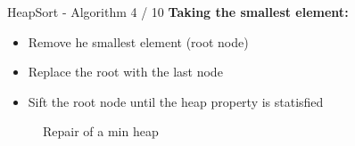 
\begin{frame}{HeapSort - Algorithm 4 / 10}
  \textbf{Taking the smallest element:}
  \begin{itemize}
    \item
      Remove he smallest element (root node)
    \item
      Replace the root with the last node
    \item
      {\color{Mittel-Blau}Sift} the root node until the
      {\color{Mittel-Blau}heap property} is statisfied
  \end{itemize}
  \begin{figure}[!h]%
    \begin{columns}%
      \begin{column}{0.3\textwidth}%
        \begin{minipage}{\textwidth}%
        \end{minipage}%
      \end{column}%
      \hspace*{0.05em}%
      \begin{column}{0.3\textwidth}%
        \begin{minipage}{\textwidth}%
        \end{minipage}
      \end{column}%
      \hspace*{0.05em}%
      \begin{column}{0.3\textwidth}%
        \begin{minipage}{\textwidth}%
        \end{minipage}%
      \end{column}%
    \end{columns}%
    \caption{Repair of a min heap}%
    \label{fig:minheap_repair}%
  \end{figure}
\end{frame}


